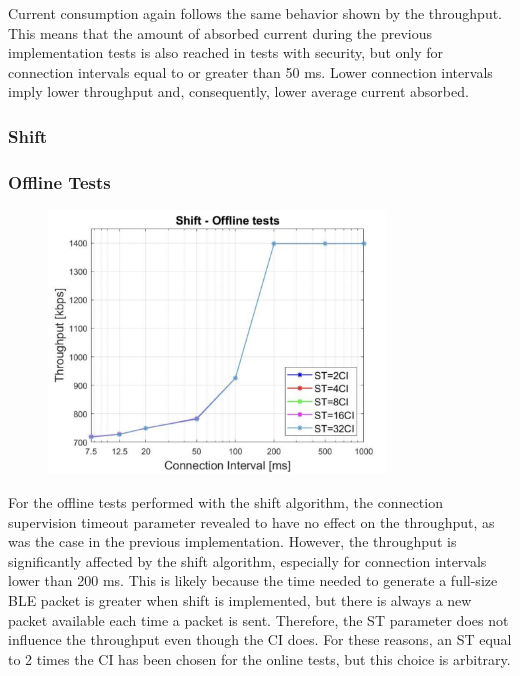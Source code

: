 \documentclass{Configuration_Files/PoliMi3i_thesis}
\begin{document}
Current consumption again follows the same behavior shown by the throughput. This means that the amount of absorbed current during the previous implementation tests is also reached in tests with security, but only for connection intervals equal to or greater than 50 ms. Lower connection intervals imply lower throughput and, consequently, lower average current absorbed.

\subsubsection*{Shift}

\subsubsection*{Offline Tests}

\begin{figure}[H]
    \centering
    \includegraphics[width=0.8\textwidth]{Results Manuel/figure14}
    \label{fig:figure1}
\end{figure}


For the offline tests performed with the shift algorithm, the connection supervision timeout parameter revealed to have no effect on the throughput, as was the case in the previous implementation. However, the throughput is significantly affected by the shift algorithm, especially for connection intervals lower than 200 ms. This is likely because the time needed to generate a full-size BLE packet is greater when shift is implemented, but there is always a new packet available each time a packet is sent. Therefore, the ST parameter does not influence the throughput even though the CI does. For these reasons, an ST equal to 2 times the CI has been chosen for the online tests, but this choice is arbitrary.
\end{document}
